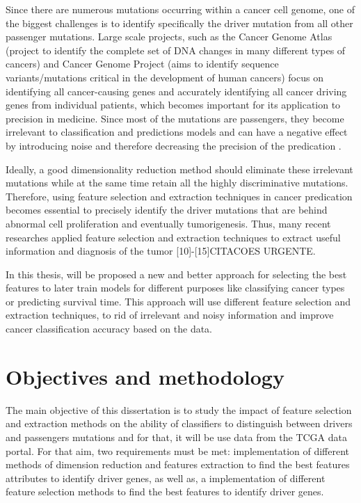 Since there are numerous mutations occurring within a cancer cell genome, one of the biggest challenges is to identify specifically the driver mutation from all other passenger mutations. Large scale projects, such as the Cancer Genome Atlas (project to identify the complete set of DNA changes in many different types of cancers) and Cancer Genome Project (aims to identify sequence variants/mutations critical in the development of human cancers) focus on identifying all cancer-causing genes and accurately identifying all cancer driving genes from individual patients, which becomes important for its application to precision in medicine. Since most of the mutations are passengers, they become irrelevant to classification and predictions models and can have a negative effect by introducing noise and therefore decreasing the precision of the predication \cite{Li}.   

Ideally, a good dimensionality reduction method should eliminate these irrelevant mutations while at the same time retain all the highly discriminative mutations. Therefore, using feature selection and extraction techniques in cancer predication becomes essential to precisely identify the driver mutations that are behind abnormal cell proliferation and eventually tumorigenesis. Thus, many recent researches applied feature selection and extraction techniques to extract useful information and diagnosis of the tumor [10]-[15]CITACOES URGENTE.

In this thesis, will be proposed a new and better approach for selecting the best features to later train models for different purposes like classifying cancer types or predicting survival time. This approach will use different feature selection and extraction techniques, to rid of irrelevant and noisy information and improve cancer classification accuracy based on the  data. 

\section{Objectives and methodology}
\label{objectives_and_methodology}
\hspace{10px}The main objective of this dissertation is to study the impact of feature selection and extraction methods on the ability of classifiers to distinguish between drivers and passengers mutations and for that, it will be use data from the TCGA data portal. For that aim, two requirements must be met: implementation of different methods of dimension reduction and features extraction to find the best features attributes to identify driver genes, as well as, a implementation of  different feature selection methods to find the best features to identify driver genes.

